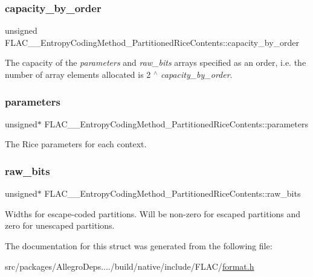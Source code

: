 \subsubsection{\texorpdfstring{capacity\+\_\+by\+\_\+order}{capacity\_by\_order}}
{\footnotesize\ttfamily unsigned F\+L\+A\+C\+\_\+\+\_\+\+Entropy\+Coding\+Method\+\_\+\+Partitioned\+Rice\+Contents\+::capacity\+\_\+by\+\_\+order}

The capacity of the {\itshape parameters} and {\itshape raw\+\_\+bits} arrays specified as an order, i.\+e. the number of array elements allocated is 2 $^\wedge$ {\itshape capacity\+\_\+by\+\_\+order}. \mbox{\label{struct_f_l_a_c_____entropy_coding_method___partitioned_rice_contents_a06e97d40923f195410a65da9311ab6a2}} 
\subsubsection{\texorpdfstring{parameters}{parameters}}
{\footnotesize\ttfamily unsigned$\ast$ F\+L\+A\+C\+\_\+\+\_\+\+Entropy\+Coding\+Method\+\_\+\+Partitioned\+Rice\+Contents\+::parameters}

The Rice parameters for each context. \mbox{\label{struct_f_l_a_c_____entropy_coding_method___partitioned_rice_contents_a915eb5369d39924bc29c948c29834279}} 
\subsubsection{\texorpdfstring{raw\+\_\+bits}{raw\_bits}}
{\footnotesize\ttfamily unsigned$\ast$ F\+L\+A\+C\+\_\+\+\_\+\+Entropy\+Coding\+Method\+\_\+\+Partitioned\+Rice\+Contents\+::raw\+\_\+bits}

Widths for escape-\/coded partitions. Will be non-\/zero for escaped partitions and zero for unescaped partitions. 

The documentation for this struct was generated from the following file\+:\begin{DoxyCompactItemize}
\item 
src/packages/\+Allegro\+Deps..../build/native/include/\+F\+L\+A\+C/\hyperlink{format_8h}{format.\+h}\end{DoxyCompactItemize}
